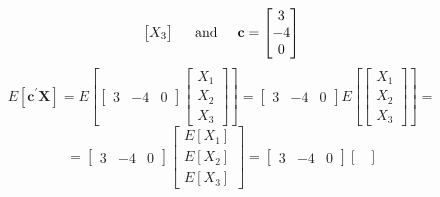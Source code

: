 \begin{enumerate}[font=\bfseries]
\begin{enumerate}
\[\begin{bmatrix}
                    X_3
                \end{bmatrix}
                \hspace{0.2in}\text{and}\hspace{0.2in}
                \textbf{c}
                =
                \begin{bmatrix}
                    3 \\
                    -4 \\
                    0
                \end{bmatrix}
            \]
            \[
                E\left[\textbf{c}^\prime\textbf{X}\right]
                =
                E\left[
                \begin{bmatrix}
                    3 & -4 & 0
                \end{bmatrix}
                    \begin{bmatrix}
                    X_1 \\
                    X_2 \\
                    X_3
                \end{bmatrix}
                \right]
                =
                \begin{bmatrix}
                    3 & -4 & 0
                \end{bmatrix}                
                E\left[
                \begin{bmatrix}
                    X_1 \\
                    X_2 \\
                    X_3
                \end{bmatrix}
                \right]
                =
            \]
            \[
                =
                \begin{bmatrix}
                    3 & -4 & 0
                \end{bmatrix}                
                \begin{bmatrix}
                    E\left[X_1\right] \\
                    E\left[X_2\right] \\
                    E\left[X_3\right]
                \end{bmatrix}
                =
                \begin{bmatrix}
                    3 & -4 & 0
                \end{bmatrix}                
                \begin{bmatrix}

\end{bmatrix}\]
\end{enumerate}
\end{enumerate}
